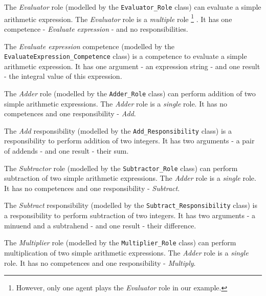 The \textit{Evaluator} role (modelled by the \texttt{Evaluator\_Role} class) can evaluate a simple arithmetic expression.
The \textit{Evaluator} role is a \textit{multiple} role
\footnote{However, only one agent plays the \textit{Evaluator} role in our example.}
.
It has one competence - \textit{Evaluate expression} - and no responsibilities.

The \textit{Evaluate expression} competence (modelled by the \texttt{EvaluateExpression\_Competence} class) is a competence to evaluate a simple arithmetic expression.
It has one argument - an expression string - and one result - the integral value of this expression. 

The \textit{Adder} role (modelled by the \texttt{Adder\_Role} class) can perform addition of two simple arithmetic expressions.
The \textit{Adder} role is a \textit{single} role.
It has no competences and one responsibility - \textit{Add}.

The \textit{Add} responsibility (modelled by the \texttt{Add\_Responsibility} class) is a responsibility to perform addition of two integers.
It has two arguments - a pair of addends - and one result - their sum.

The \textit{Subtractor} role (modelled by the \texttt{Subtractor\_Role} class) can perform subtraction of two simple arithmetic expressions.
The \textit{Adder} role is a \textit{single} role.
It has no competences and one responsibility - \textit{Subtract}.

The \textit{Subtract} responsibility (modelled by the \texttt{Subtract\_Responsibility} class) is a responsibility to perform subtraction of two integers.
It has two arguments - a minuend and a subtrahend - and one result - their difference.

The \textit{Multiplier} role (modelled by the \texttt{Multiplier\_Role} class) can perform multiplication of two simple arithmetic expressions.
The \textit{Adder} role is a \textit{single} role.
It has no competences and one responsibility - \textit{Multiply}.

